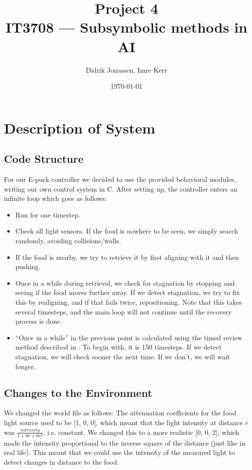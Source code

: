 \documentclass[a4paper,12pt]{article}
\author{Didrik Jonassen, Imre Kerr\vspace{-2ex}}
\title{\vspace{-5ex}Project 4\\ IT3708 --- Subsymbolic methods in AI}
\date{\today}
\begin{document}
\maketitle

\section{Description of System}
\subsection{Code Structure}
For our E-puck controller we decided to use the provided behavioral modules, writing our own control system in C. After setting up, the controller enters an infinite loop which goes as follows:
\begin{itemize}
\item{Run for one timestep.}
\item{Check all light sensors. If the food is nowhere to be seen, we simply search randomly, avoiding collisions/walls.}
\item{If the food is nearby, we try to retrieve it by first aligning with it and then pushing.}
\item{Once in a while during retrieval, we check for stagnation by stopping and seeing if the food moves further away. If we detect stagnation, we try to fix this by realigning, and if that fails twice, repositioning. Note that this takes several timesteps, and the main loop will not continue until the recovery process is done.}
\item{``Once in a while'' in the previous point is calculated using the timed review method described in \cite{thesis}. To begin with, it is 150 timesteps. If we detect stagnation, we will check sooner the next time. If we don't, we will wait longer.}
\end{itemize}

\subsection{Changes to the Environment}
We changed the world file as follows: The attenuation coefficients for the food light source used to be [1, 0, 0], which meant that the light intensity at distance $r$ was $\frac{intensity}{1+0 r + 0 r^2}$, i.e. constant. We changed this to a more realistic [0, 0, 2], which made the intensity proportional to the inverse square of the distance (just like in real life). This meant that we could use the intensity of the measured light to detect changes in distance to the food.
\end{document}
